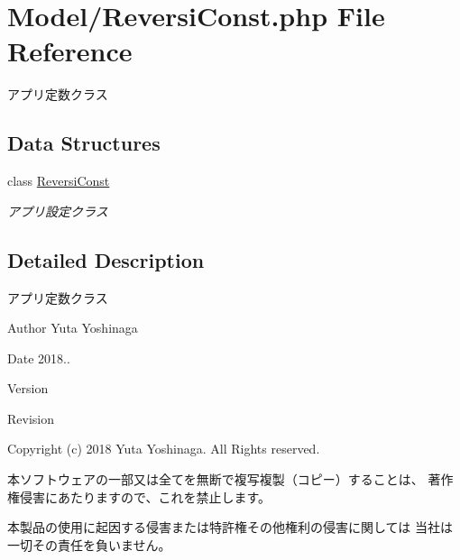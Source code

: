 \hypertarget{_reversi_const_8php}{}\section{Model/\+Reversi\+Const.php File Reference}
\label{_reversi_const_8php}


アプリ定数クラス  


\subsection*{Data Structures}
\begin{DoxyCompactItemize}
\item 
class \hyperlink{class_reversi_const}{Reversi\+Const}
\begin{DoxyCompactList}\small\item\em アプリ設定クラス \end{DoxyCompactList}\end{DoxyCompactItemize}


\subsection{Detailed Description}
アプリ定数クラス 

\begin{DoxyAuthor}{Author}
Yuta Yoshinaga 
\end{DoxyAuthor}
\begin{DoxyDate}{Date}
2018.. 
\end{DoxyDate}
\begin{DoxyParagraph}{Version}

\end{DoxyParagraph}
\begin{DoxyParagraph}{Revision}

\end{DoxyParagraph}


Copyright (c) 2018 Yuta Yoshinaga. All Rights reserved.


\begin{DoxyItemize}
\item 本ソフトウェアの一部又は全てを無断で複写複製（コピー）することは、 著作権侵害にあたりますので、これを禁止します。
\item 本製品の使用に起因する侵害または特許権その他権利の侵害に関しては 当社は一切その責任を負いません。 
\end{DoxyItemize}